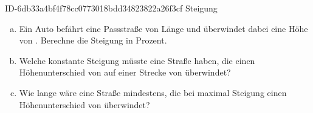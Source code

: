 \begin{exercise}
      {ID-6db33a4bf4f78cc0773018bdd34823822a26f3cf}
      {Steigung}
  \ifproblem\problem
    \begin{enumerate}[a)]
      \item Ein Auto befährt eine Passstraße von  Länge und überwindet
            dabei eine Höhe von . Berechne die Steigung in Prozent.
      \item Welche konstante Steigung müsste eine Straße haben, die einen
            Höhenunterschied von  auf einer Strecke von
             überwindet?
      \item Wie lange wäre eine Straße mindestens, die bei maximal 
            Steigung einen Höhenunterschied von  überwindet?
    \end{enumerate}
  \fi
\end{exercise}
